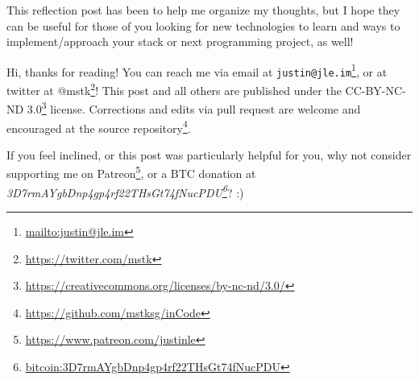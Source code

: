 \documentclass[]{article}
\renewcommand{\href}[2]{#2\footnote{\url{#1}}}
\begin{document}
This reflection post has been to help me organize my thoughts, but I hope they
can be useful for those of you looking for new technologies to learn and ways to
implement/approach your stack or next programming project, as well!

Hi, thanks for reading! You can reach me via email at
\href{mailto:justin@jle.im}{\nolinkurl{justin@jle.im}}, or at twitter at
\href{https://twitter.com/mstk}{@mstk}! This post and all others are published
under the \href{https://creativecommons.org/licenses/by-nc-nd/3.0/}{CC-BY-NC-ND
3.0} license. Corrections and edits via pull request are welcome and encouraged
at \href{https://github.com/mstksg/inCode}{the source repository}.

If you feel inclined, or this post was particularly helpful for you, why not
consider \href{https://www.patreon.com/justinle}{supporting me on Patreon}, or a
BTC donation at
\emph{\href{bitcoin:3D7rmAYgbDnp4gp4rf22THsGt74fNucPDU}{3D7rmAYgbDnp4gp4rf22THsGt74fNucPDU}}?
:)
\end{document}
